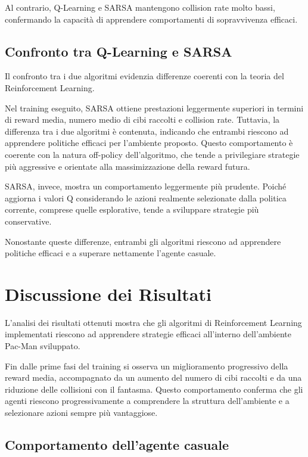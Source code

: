 \documentclass[12pt,a4paper]{report}
\begin{document}
Al contrario, Q-Learning e SARSA mantengono collision rate molto bassi, confermando la capacità di apprendere comportamenti di sopravvivenza efficaci.

\section{Confronto tra Q-Learning e SARSA}

Il confronto tra i due algoritmi evidenzia differenze coerenti con la teoria del Reinforcement Learning.

Nel training eseguito, SARSA ottiene prestazioni leggermente superiori in termini di reward media, numero medio di cibi raccolti e collision rate. Tuttavia, la differenza tra i due algoritmi è contenuta, indicando che entrambi riescono ad apprendere politiche efficaci per l’ambiente proposto. Questo comportamento è coerente con la natura off-policy dell’algoritmo, che tende a privilegiare strategie più aggressive e orientate alla massimizzazione della reward futura.

SARSA, invece, mostra un comportamento leggermente più prudente. Poiché aggiorna i valori Q considerando le azioni realmente selezionate dalla politica corrente, comprese quelle esplorative, tende a sviluppare strategie più conservative.

Nonostante queste differenze, entrambi gli algoritmi riescono ad apprendere politiche efficaci e a superare nettamente l’agente casuale.

\chapter{Discussione dei Risultati}

L’analisi dei risultati ottenuti mostra che gli algoritmi di Reinforcement Learning implementati riescono ad apprendere strategie efficaci all’interno dell’ambiente Pac-Man sviluppato.

Fin dalle prime fasi del training si osserva un miglioramento progressivo della reward media, accompagnato da un aumento del numero di cibi raccolti e da una riduzione delle collisioni con il fantasma. Questo comportamento conferma che gli agenti riescono progressivamente a comprendere la struttura dell’ambiente e a selezionare azioni sempre più vantaggiose.

\section{Comportamento dell’agente casuale}
\end{document}
